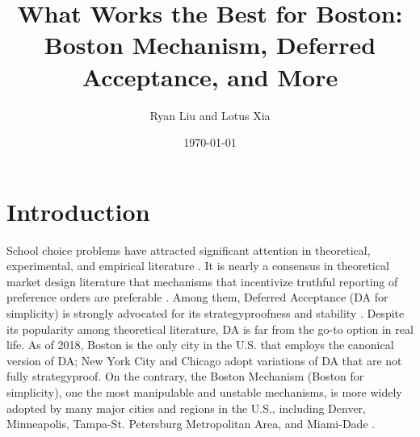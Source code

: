 \documentclass[10pt, reqno]{amsart}
\title{What Works the Best for Boston: Boston Mechanism, Deferred Acceptance, and More}
\author{Ryan Liu and Lotus Xia}
\date{\today}
\begin{document}
\maketitle






\section{Introduction}

School choice problems have attracted significant attention in theoretical, experimental, and empirical literature \citep{chen2013boston,abdulkadirouglu2003school,kapor2020heterogeneous}. It is nearly a consensus in theoretical market design literature that mechanisms that incentivize truthful reporting of preference orders are preferable \citep{azevedo2019strategy}. Among them, Deferred Acceptance (DA for simplicity) is strongly advocated for its strategyproofness and stability \citep{pathak2008leveling}. Despite its popularity among theoretical literature, DA is far from the go-to option in real life. As of 2018, Boston is the only city in the U.S. that employs the canonical version of DA; New York City and Chicago adopt variations of DA that are not fully strategyproof. On the contrary, the Boston Mechanism (Boston for simplicity), one the most manipulable and unstable mechanisms, is more widely adopted by many major cities and regions in the U.S., including Denver, Minneapolis, Tampa-St. Petersburg Metropolitan Area, and Miami-Dade \citep{agarwal2018demand}. 
\end{document}
